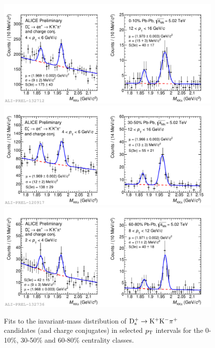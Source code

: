 
\begin{figure}[!htbp]
 \begin{center}
  \includegraphics[width=.9\textwidth]{FigCap5/MassDs_PbPb010_5TeV_pt_4-6_12-16.pdf}
  \includegraphics[width=.9\textwidth]{FigCap5/MassDs_PbPb3050_5TeV_pt_4-6_12-16.pdf}
  \includegraphics[width=.9\textwidth]{FigCap5/MassDs_PbPb6080_5TeV_pt_2-4_8-12.pdf}
\end{center}
 \caption{Fits to the invariant-mass distribution of ${\rm D^{+}_\mathrm{s}\to K^+ K^-\pi^+}$ candidates (and charge conjugates) in selected $p_{\rm T}$ intervals for the 0-10\%, 30-50$\%$ and 60-80\% centrality classes. }
 \label{fig:FigInvMassDs_pbpb} 
\end{figure} 
 

